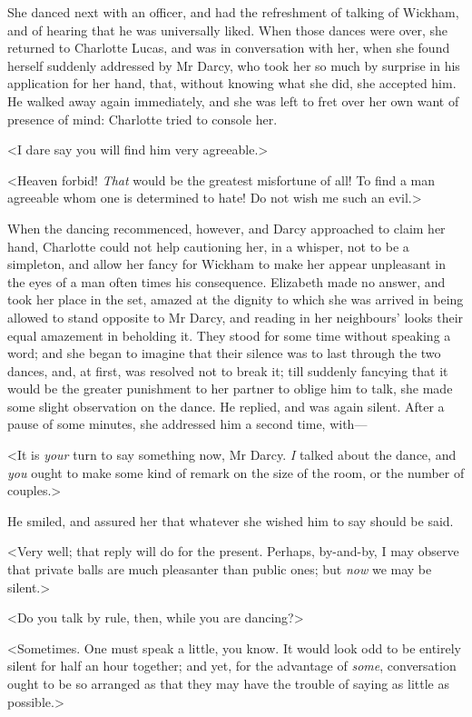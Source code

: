 She danced next with an officer, and had the refreshment of talking of Wickham, and of hearing that he was universally liked. When those dances were over, she returned to Charlotte Lucas, and was in conversation with her, when she found herself suddenly addressed by Mr Darcy, who took her so much by surprise in his application for her hand, that, without knowing what she did, she accepted him. He walked away again immediately, and she was left to fret over her own want of presence of mind: Charlotte tried to console her.

<I dare say you will find him very agreeable.>

<Heaven forbid! \textit{That} would be the greatest misfortune of all! To find a man agreeable whom one is determined to hate! Do not wish me such an evil.>

When the dancing recommenced, however, and Darcy ap\-proached to claim her hand, Charlotte could not help cautioning her, in a whisper, not to be a simpleton, and allow her fancy for Wickham to make her appear unpleasant in the eyes of a man often times his consequence. Elizabeth made no answer, and took her place in the set, amazed at the dignity to which she was arrived in being allowed to stand opposite to Mr Darcy, and reading in her neighbours' looks their equal amazement in beholding it. They stood for some time without speaking a word; and she began to imagine that their silence was to last through the two dances, and, at first, was resolved not to break it; till suddenly fancying that it would be the greater punishment to her partner to oblige him to talk, she made some slight observation on the dance. He replied, and was again silent. After a pause of some minutes, she addressed him a second time, with—

<It is \textit{your} turn to say something now, Mr Darcy. \textit{I} talked about the dance, and \textit{you} ought to make some kind of remark on the size of the room, or the number of couples.>

He smiled, and assured her that whatever she wished him to say should be said.

<Very well; that reply will do for the present. Perhaps, by-and-by, I may observe that private balls are much pleasanter than public ones; but \textit{now} we may be silent.>

<Do you talk by rule, then, while you are dancing?>

<Sometimes. One must speak a little, you know. It would look odd to be entirely silent for half an hour together; and yet, for the advantage of \textit{some}, conversation ought to be so arranged as that they may have the trouble of saying as little as possible.>

